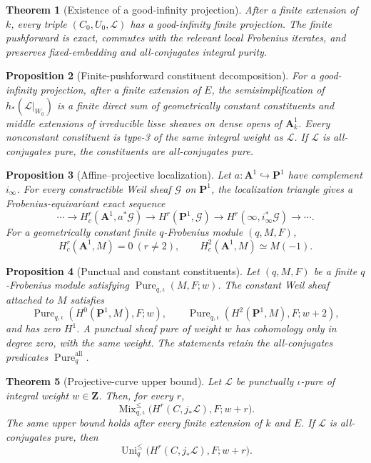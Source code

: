 \documentclass[10pt]{article}
\newtheorem{theorem}{Theorem}[section]
\newtheorem{proposition}[theorem]{Proposition}
\theoremstyle{definition}
\newcommand{\MixLe}{\operatorname{Mix}^{\leq}}
\newcommand{\UniLe}{\operatorname{Uni}^{\leq}}
\newcommand{\Pure}{\operatorname{Pure}}
\begin{document}
\begin{theorem}[Existence of a good-infinity projection]
After a finite extension of \(k\), every triple
\((C_0,U_0,\mathcal L)\) has a good-infinity finite projection.  The finite
pushforward is exact, commutes with the relevant local Frobenius iterates,
and preserves fixed-embedding and all-conjugates integral purity.
\end{theorem}

\begin{proposition}[Finite-pushforward constituent decomposition]
For a good-infinity projection, after a finite extension of \(E\), the
semisimplification of \(h_*(\mathcal L|_{W_0})\) is a finite direct sum of
geometrically constant constituents and middle extensions of irreducible
lisse sheaves on dense opens of \(\mathbf A^1_k\).  Every nonconstant
constituent is type-3 of the same integral weight as \(\mathcal L\).  If
\(\mathcal L\) is all-conjugates pure, the constituents are all-conjugates
pure.
\end{proposition}

\begin{proposition}[Affine--projective localization]
Let \(a:\mathbf A^1\hookrightarrow\mathbf P^1\) have complement
\(i_\infty\).  For every constructible Weil sheaf \(\mathcal G\) on
\(\mathbf P^1\), the localization triangle gives a
Frobenius-equivariant exact sequence
\[
 \cdots\to H_c^r(\mathbf A^1,a^*\mathcal G)
 \to H^r(\mathbf P^1,\mathcal G)
 \to H^r(\infty,i_\infty^*\mathcal G)
 \to\cdots.
\]
For a geometrically constant finite \(q\)-Frobenius module \((q,M,F)\),
\[
 H_c^r(\mathbf A^1,M)=0\ (r\ne2),
 \qquad H_c^2(\mathbf A^1,M)\simeq M(-1).
\]
\end{proposition}

\begin{proposition}[Punctual and constant constituents]
Let \((q,M,F)\) be a finite \(q\)-Frobenius module satisfying
\(\Pure_{q,\iota}(M,F;w)\).  The constant Weil sheaf attached to \(M\)
satisfies
\[
 \Pure_{q,\iota}(H^0(\mathbf P^1,M),F;w),
 \qquad
 \Pure_{q,\iota}(H^2(\mathbf P^1,M),F;w+2),
\]
and has zero \(H^1\).  A punctual sheaf pure of weight \(w\) has cohomology
only in degree zero, with the same weight.  The statements retain the
all-conjugates predicates \(\Pure_q^{\mathrm{all}}\).
\end{proposition}

\begin{theorem}[Projective-curve upper bound]
Let \(\mathcal L\) be punctually \(\iota\)-pure of integral weight
\(w\in\mathbf Z\).  Then, for every \(r\),
\[
 \MixLe_{q,\iota}
 \bigl(H^r(C,j_*\mathcal L),F;w+r\bigr).
\]
The same upper bound holds after every finite extension of \(k\) and \(E\).
If \(\mathcal L\) is all-conjugates pure, then
\[
 \UniLe_q\bigl(H^r(C,j_*\mathcal L),F;w+r\bigr).
\]
\end{theorem}
\end{document}
